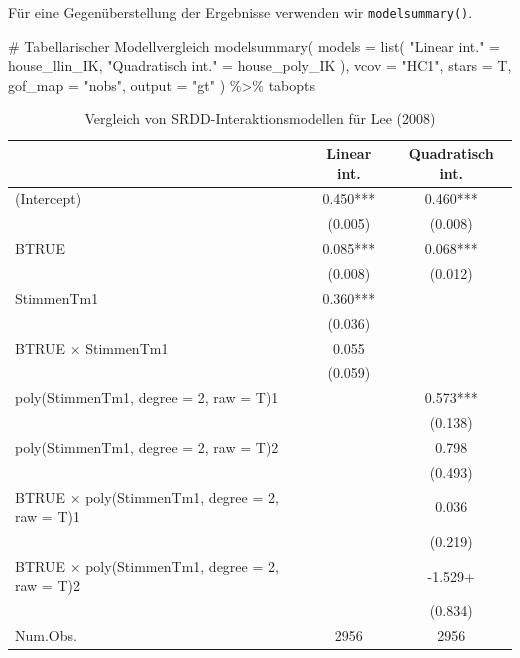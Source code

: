 \documentclass[
  a4paper,
  DIV=11,
  oneside]{scrreprt}
\newenvironment{Shaded}{\begin{snugshade}}{\end{snugshade}}
\newcommand{\AttributeTok}[1]{\textcolor[rgb]{0.40,0.45,0.13}{#1}}
\newcommand{\CommentTok}[1]{\textcolor[rgb]{0.37,0.37,0.37}{#1}}
\newcommand{\FunctionTok}[1]{\textcolor[rgb]{0.28,0.35,0.67}{#1}}
\newcommand{\NormalTok}[1]{\textcolor[rgb]{0.00,0.23,0.31}{#1}}
\newcommand{\OtherTok}[1]{\textcolor[rgb]{0.00,0.23,0.31}{#1}}
\newcommand{\SpecialCharTok}[1]{\textcolor[rgb]{0.37,0.37,0.37}{#1}}
\newcommand{\StringTok}[1]{\textcolor[rgb]{0.13,0.47,0.30}{#1}}
\begin{document}
Für eine Gegenüberstellung der Ergebnisse verwenden wir
\texttt{modelsummary()}.

\begin{Shaded}
\begin{Highlighting}[]
\CommentTok{\# Tabellarischer Modellvergleich}
\FunctionTok{modelsummary}\NormalTok{(}
  \AttributeTok{models =} \FunctionTok{list}\NormalTok{(}
    \StringTok{"Linear int."} \OtherTok{=}\NormalTok{ house\_llin\_IK, }
    \StringTok{"Quadratisch int."} \OtherTok{=}\NormalTok{ house\_poly\_IK}
\NormalTok{  ),  }
  \AttributeTok{vcov =} \StringTok{"HC1"}\NormalTok{, }
  \AttributeTok{stars =}\NormalTok{ T,}
  \AttributeTok{gof\_map =} \StringTok{"nobs"}\NormalTok{, }
  \AttributeTok{output =} \StringTok{"gt"}
\NormalTok{) }\SpecialCharTok{\%\textgreater{}\%} 
\NormalTok{  tabopts}
\end{Highlighting}
\end{Shaded}

\begingroup
\fontsize{12.0pt}{14.4pt}\selectfont
\setlength{\LTpost}{0mm}

\begin{longtable}{lcc}

\caption{\label{tbl-intmodsLee}Vergleich von SRDD-Interaktionsmodellen
für Lee (2008)}

\tabularnewline

\toprule
  & Linear int. & Quadratisch int. \\ 
\midrule\addlinespace[2.5pt]
(Intercept) & 0.450*** & 0.460*** \\ 
 & (0.005) & (0.008) \\ 
BTRUE & 0.085*** & 0.068*** \\ 
 & (0.008) & (0.012) \\ 
StimmenTm1 & 0.360*** &  \\ 
 & (0.036) &  \\ 
BTRUE × StimmenTm1 & 0.055 &  \\ 
 & (0.059) &  \\ 
poly(StimmenTm1, degree = 2, raw = T)1 &  & 0.573*** \\ 
 &  & (0.138) \\ 
poly(StimmenTm1, degree = 2, raw = T)2 &  & 0.798 \\ 
 &  & (0.493) \\ 
BTRUE × poly(StimmenTm1, degree = 2, raw = T)1 &  & 0.036 \\ 
 &  & (0.219) \\ 
BTRUE × poly(StimmenTm1, degree = 2, raw = T)2 &  & -1.529+ \\ 
{} & {} & {(0.834)} \\ 
Num.Obs. & 2956 & 2956 \\ 
\bottomrule

\end{longtable}
\end{document}
